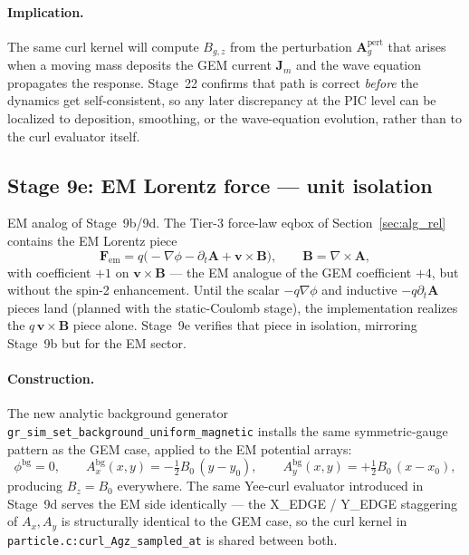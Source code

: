 \documentclass[11pt,a4paper]{article}
\newcommand{\vv}[1]{\mathbf{#1}}
\newcommand{\Ag}{\vv{A}_g}
\begin{document}
\paragraph{Implication.}  The same curl kernel will compute $B_{g,z}$
from the perturbation $\Ag^{\mathrm{pert}}$ that arises when a moving
mass deposits the GEM current $\vv{J}_m$ and the wave equation
propagates the response.  Stage~22 confirms that path is correct
\emph{before} the dynamics get self-consistent, so any later
discrepancy at the PIC level can be localized to deposition, smoothing,
or the wave-equation evolution, rather than to the curl evaluator
itself.

\subsection{Stage 9e: EM Lorentz force --- unit isolation}
\label{sec:stage_em_cyclotron}

EM analog of Stage~9b/9d.  The Tier-3 force-law eqbox of
Section~\ref{sec:alg_rel} contains the EM Lorentz piece
\begin{equation}
\label{eq:Fem_lorentz}
  \vv{F}_{\mathrm{em}}
  = q\bigl(-\nabla\phi - \partial_t\vv{A} + \vv{v}\!\times\!\vv{B}\bigr),
  \qquad \vv{B} = \nabla\!\times\!\vv{A},
\end{equation}
with coefficient $+1$ on $\vv{v}\!\times\!\vv{B}$ --- the EM analogue of the
GEM coefficient $+4$, but without the spin-2 enhancement.  Until the
scalar $-q\nabla\phi$ and inductive $-q\partial_t\vv{A}$ pieces land
(planned with the static-Coulomb stage), the implementation realizes the
$q\,\vv{v}\!\times\!\vv{B}$ piece alone.  Stage~9e verifies that piece in
isolation, mirroring Stage~9b but for the EM sector.

\paragraph{Construction.}  The new analytic background generator
\texttt{gr\_sim\_set\_background\_uniform\_magnetic} installs the same
symmetric-gauge pattern as the GEM case, applied to the EM potential
arrays:
\begin{equation}
\label{eq:em_uniform_bg_symmetric_gauge}
  \phi^{\mathrm{bg}} = 0,\qquad
  A_{x}^{\mathrm{bg}}(x,y) = -\tfrac{1}{2}B_0\,(y - y_0),\qquad
  A_{y}^{\mathrm{bg}}(x,y) = +\tfrac{1}{2}B_0\,(x - x_0),
\end{equation}
producing $B_z = B_0$ everywhere.  The same Yee-curl evaluator
introduced in Stage~9d serves the EM side identically --- the X\_EDGE /
Y\_EDGE staggering of $A_x, A_y$ is structurally identical to the GEM
case, so the curl kernel in
\texttt{particle.c:curl\_Agz\_sampled\_at} is shared between both.
\end{document}
